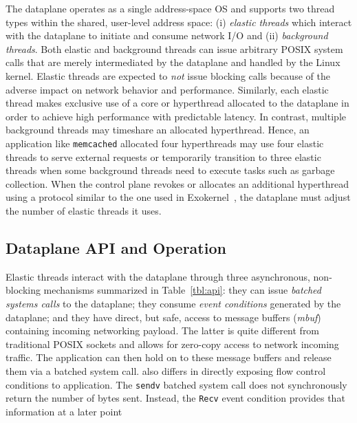 The \ix dataplane operates as a single address-space OS and supports
two thread types within the shared, user-level address space: (i)
\emph{elastic threads} which interact with the \ix dataplane to
initiate and consume network I/O and (ii) \emph{background threads}.
Both elastic and background threads can issue arbitrary POSIX system
calls that are merely intermediated by the dataplane and handled
by the Linux kernel.  Elastic threads are expected to \emph{not} issue
blocking calls because of the adverse impact on network behavior and
performance. Similarly, each elastic thread makes exclusive use of a
core or hyperthread allocated to the dataplane in order to achieve
high performance with predictable latency. In contrast, multiple
background threads may timeshare an allocated hyperthread. Hence, an
application like \texttt{memcached} allocated four hyperthreads may
use four elastic threads to serve external requests or temporarily
transition to three elastic threads when some background threads need
to execute tasks such as garbage collection. When the control plane
revokes or allocates an additional hyperthread using a protocol
similar to the one used in Exokernel~\cite{DBLP:conf/sosp/EnglerKO95},
the dataplane must adjust the number of elastic threads it uses.


\subsection{Dataplane API and Operation}
\label{sec:impl:kernel}

Elastic threads interact with the \ix dataplane through three
asynchronous, non-blocking mechanisms summarized in
Table~\ref{tbl:api}: they can issue \emph{batched systems calls} to
the dataplane; they consume \emph{event conditions} generated by the
dataplane; and they have direct, but safe, access to message buffers
(\emph{mbuf}) containing incoming networking payload. The latter is
quite different from traditional POSIX sockets and allows for
zero-copy access to network incoming traffic.  The application can
then hold on to these message buffers and release them via a batched
system call.  \ix also differs in directly exposing flow control
conditions to application. The \texttt{sendv} batched system call does
not synchronously return the number of bytes sent. Instead, the
\texttt{Recv} event condition provides that information at a later point

